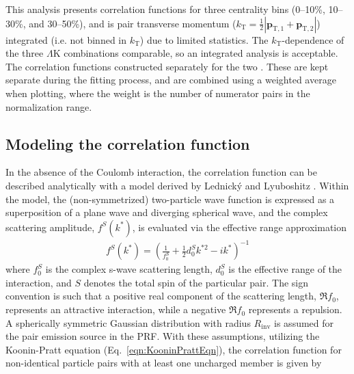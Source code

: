 \documentclass[ALICE,manyauthors]{cernphprep}
\newcommand{\LamK}{$\Lambda$K\xspace}
\begin{document}
This analysis presents correlation functions for three centrality bins (0--10\%, 10--30\%, and 30--50\%), and is pair transverse momentum ($k_{\mathrm{T}} = \frac{1}{2}|\mathbf{p}_{\mathrm{T,1}}+\mathbf{p}_{\mathrm{T,2}}|$) integrated (i.e. not binned in $k_{\mathrm{T}}$) due to limited statistics.
The $k_{\mathrm{T}}$-dependence{\color{blue}{s}} of the three \LamK {\color{blue}{charge}} combinations {\color{red}{is}} {\color{blue}{are}} comparable, so an integrated analysis is acceptable.
The correlation functions {\color{red}{are}} {\color{blue}{were}} constructed separately for the two {\color{red}{magnetic field configurations ($++$ and $--$)}} {\color{blue}{different field polarities applied by the ALICE L3 solenoid magnet during the data acquisition}}.
These are kept separate during the fitting process, and are combined using a weighted average when plotting, where the weight is the number of numerator pairs in the normalization range.

\subsection{Modeling the correlation function}
\label{sec:ModelingCF}


In the absence of the Coulomb interaction, the correlation function can be described analytically with a model derived by Lednick\'y and Lyuboshitz \cite{Lednicky:82}.
Within the model, the (non-symmetrized) two-particle wave function is expressed as a superposition of a plane wave and diverging spherical wave, and the complex scattering amplitude, $f^{S}(k^{*})$, is evaluated via the effective range approximation
\begin{equation}
\begin{aligned}
f^{S}(k^{*}) = \left( \frac{1}{f^{S}_{0}} + \frac{1}{2}d^{S}_{0}k^{*2} - ik^{*} \right)^{-1}
\end{aligned}
\label{eqn:ScatteringParam}
\end{equation}
where $f^{S}_{0}$ is the complex s-wave scattering length, $d^{S}_{0}$ is the effective range of the interaction, and $S$ denotes the total spin of the particular pair.
The sign convention is such that a positive real component of the scattering length, $\Re f_{0}$, represents an attractive interaction, while a negative $\Re f_{0}$ represents a repulsion.
A spherically symmetric Gaussian distribution with radius $R_{\mathrm{inv}}$  is assumed for the pair emission source in the PRF.
With these assumptions, utilizing the Koonin-Pratt equation (Eq.\ \ref{eqn:KooninPrattEqn}), the correlation function for non-identical particle pairs with at least one uncharged member is given by \cite{Lednicky:82}
\end{document}
